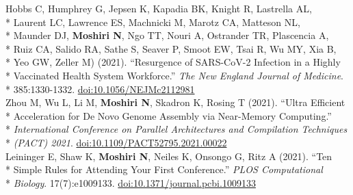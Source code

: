 \documentclass[margin,line]{res}
\begin{document}
\begin{resume}
\hspace*{9.5mm} Hobbs C, Humphrey G, Jepsen K, Kapadia BK, Knight R, Lastrella AL,\\*
\hspace*{9.5mm} Laurent LC, Lawrence ES, Machnicki M, Marotz CA, Matteson NL,\\*
\hspace*{9.5mm} Maunder DJ, \textbf{Moshiri N}, Ngo TT, Nouri A, Ostrander TR, Plascencia A,\\*
\hspace*{9.5mm} Ruiz CA, Salido RA, Sathe S, Seaver P, Smoot EW, Tsai R, Wu MY, Xia B,\\*
\hspace*{9.5mm} Yeo GW, Zeller M) (2021). ``Resurgence of SARS-CoV-2 Infection in a Highly\\*
\hspace*{9.5mm} Vaccinated Health System Workforce.'' \textit{The New England Journal of Medicine}.\\*\vspace{2mm}
\hspace*{8mm} 385:1330-1332. \href{https://doi.org/10.1056/NEJMc2112981}{doi:10.1056/NEJMc2112981}\\
\hspace*{4mm} Zhou M, Wu L, Li M, \textbf{Moshiri N}, Skadron K, Rosing T (2021). ``Ultra Efficient\\*
\hspace*{9.5mm} Acceleration for De Novo Genome Assembly via Near-Memory Computing.''\\*
\hspace*{9.5mm} \textit{International Conference on Parallel Architectures and Compilation Techniques}\\*\vspace{2mm}
\hspace*{8mm} \textit{(PACT) 2021}. \href{https://doi.org/10.1109/PACT52795.2021.00022}{doi:10.1109/PACT52795.2021.00022}\\
\hspace*{4mm} Leininger E, Shaw K, \textbf{Moshiri N}, Neiles K, Onsongo G, Ritz A (2021). ``Ten\\*
\hspace*{9.5mm} Simple Rules for Attending Your First Conference.'' \textit{PLOS Computational}\\*\vspace{2mm}
\hspace*{8mm} \textit{Biology}. 17(7):e1009133. \href{https://doi.org/10.1371/journal.pcbi.1009133}{doi:10.1371/journal.pcbi.1009133}\\

\end{resume}
\end{document}
